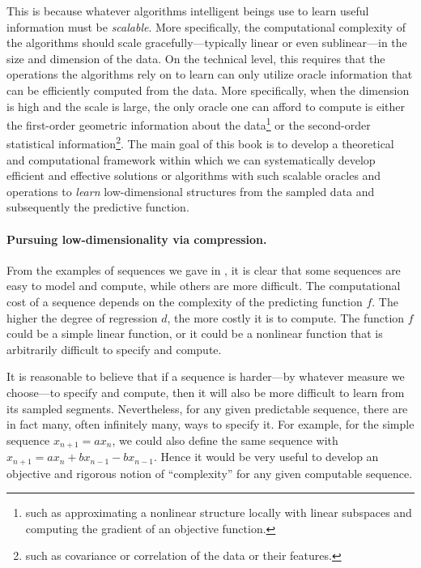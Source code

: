 \documentclass[../../book-main.tex]{subfiles}
\begin{document}
This is because whatever algorithms intelligent beings use to learn useful information must be \textit{scalable}. More specifically, the computational complexity of the algorithms should scale gracefully---typically linear or even sublinear---in the size and dimension of the data. On the technical level, this requires that the operations the algorithms rely on to learn can only utilize oracle information that can be efficiently computed from the data. More specifically, when the dimension is high and the scale is large, the only oracle one can afford to compute is either the first-order geometric information about the data\footnote{such as approximating a nonlinear structure locally with linear subspaces and computing the gradient of an objective function.} or the second-order statistical information\footnote{such as covariance or correlation of the data or their features.}.
The main goal of this book is to develop a theoretical and computational framework within which we can systematically develop efficient and effective solutions or algorithms with such scalable oracles and operations to \textit{learn} low-dimensional structures from the sampled data and subsequently the predictive function.


\paragraph{Pursuing low-dimensionality via compression.}
From the examples of sequences we gave in , it is clear that some sequences are easy to model and compute, while others are more difficult. The computational cost of a sequence depends on the complexity of the predicting function $f$. The higher the degree of regression $d$, the more costly it is to compute. The function $f$ could be a simple linear function, or it could be a nonlinear function that is arbitrarily difficult to specify and compute.

It is reasonable to believe that if a sequence is harder---by whatever measure we choose---to specify and compute, then it will also be more difficult to learn from its sampled segments. Nevertheless, for any given predictable sequence, there are in fact many, often infinitely many, ways to specify it. For example, for the simple sequence $x_{n+1} = a x_{n}$, we could also define the same sequence with $x_{n+1} = a x_n + b x_{n-1} - b x_{n-1}$.
Hence it would be very useful to develop an objective and rigorous notion of ``complexity'' for any given computable sequence.
\end{document}
